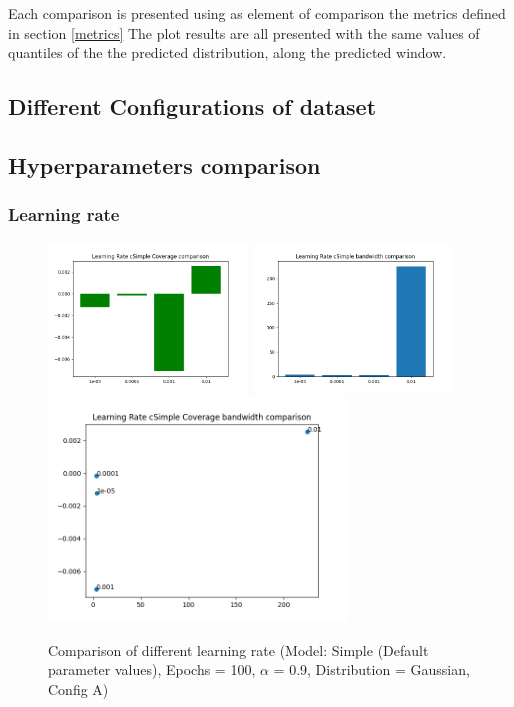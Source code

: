 \documentclass[a4paper, 12pt]{article}
\begin{document}
Each comparison is presented using as element of comparison the metrics defined in section \ref{metrics}
The plot results are all presented with the same values of quantiles of the the predicted distribution, along the predicted window.

\subsection{Different Configurations of dataset}

\subsection{Hyperparameters comparison}

\subsubsection{Learning rate} \label{comp_lr}

\begin{figure}[!h]
    \centering
    \includegraphics[width=200px]{plots/hist/a/lr/cSimple/Coverage.png}
    \includegraphics[width=200px]{plots/hist/a/lr/cSimple/bandwidth.png}
    \includegraphics[width=300px]{plots/scatter/a/lr/cSimple/Coverage_bandwidth.png}
    \caption{Comparison of different learning rate (Model: Simple (Default parameter values), Epochs = 100, $\alpha$ = 0.9, Distribution = Gaussian, Config A)}
    \label{fig:comp_lr}
\end{figure}
\end{document}
